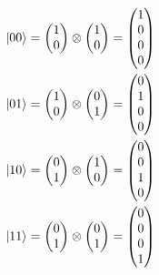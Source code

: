 \documentclass[]{ltjsarticle}
\begin{document}
\begin{align}
    \ket{00} 
    =
    \begin{pmatrix}
        1 \\ 0    
    \end{pmatrix}
    \otimes
    \begin{pmatrix}
        1 \\ 0    
    \end{pmatrix}
    =
    \begin{pmatrix}
        1 \\ 0 \\ 0 \\ 0   
    \end{pmatrix} \\
    \ket{01} 
    =
    \begin{pmatrix}
        1 \\ 0    
    \end{pmatrix}
    \otimes
    \begin{pmatrix}
        0 \\ 1    
    \end{pmatrix}
    =
    \begin{pmatrix}
        0 \\ 1 \\ 0 \\ 0   
    \end{pmatrix} \\
    \ket{10} 
    =
    \begin{pmatrix}
        0 \\ 1    
    \end{pmatrix}
    \otimes
    \begin{pmatrix}
        1 \\ 0    
    \end{pmatrix}
    =
    \begin{pmatrix}
        0 \\ 0 \\ 1 \\ 0   
    \end{pmatrix} \\
    \ket{11} 
    =
    \begin{pmatrix}
        0 \\ 1    
    \end{pmatrix}
    \otimes
    \begin{pmatrix}
        0 \\ 1    
    \end{pmatrix}
    =
    \begin{pmatrix}
        0 \\ 0 \\ 0 \\ 1
    \end{pmatrix}
\end{align}
\end{document}
